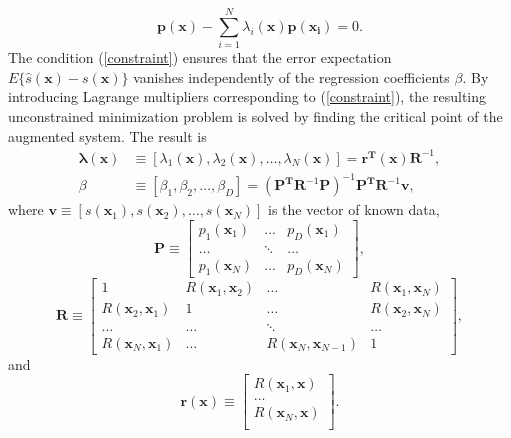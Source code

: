 \documentclass[12pt]{article}
\begin{document}
\begin{equation}
 \mathbf{p}(\mathbf{x}) - \sum_{i=1}^N
  \lambda_i(\mathbf{x})\mathbf{p}(\mathbf{x_i}) = 0. \label{constraint}
\end{equation}
The condition (\ref{constraint}) ensures that the error expectation
$E\{\hat{s}(\mathbf{x}) - s(\mathbf{x}) \}$ vanishes independently of the
regression coefficients $\beta$.  By introducing Lagrange multipliers
corresponding to (\ref{constraint}), the resulting unconstrained
minimization problem is solved by finding the
critical point of the augmented system.  The result is \cite{Knap2008}
\begin{align}
\mathbf{\lambda(x)} &\equiv \left [ \lambda_1(\mathbf{x}), \lambda_2(\mathbf{x}), \ldots,
  \lambda_N(\mathbf{x}) \right ] = \mathbf{r^T}(\mathbf{x})
  \mathbf{R}^{-1}, \\
\beta & \equiv \left [ \beta_1, \beta_2, \ldots, \beta_D \right ] = \left ( \mathbf{P^T}\mathbf{R}^{-1} \mathbf{P} \right )^{-1} \mathbf{P^T}\mathbf{R}^{-1}\mathbf{v},
\end{align}
where $\mathbf{v} \equiv [ s(\mathbf{x}_1), s(\mathbf{x}_2), \ldots,
  s(\mathbf{x}_N) ]$ is the vector of known data,
\begin{equation}
\mathbf{P} \equiv \left [
\begin{array}{ccc}
p_1(\mathbf{x}_1) & \ldots & p_D(\mathbf{x}_1) \\
\ldots & \ddots & \ldots \\
p_1(\mathbf{x}_N) & \ldots & p_D(\mathbf{x}_N)
\end{array}
\right ],
\end{equation}
\begin{equation}
\mathbf{R} \equiv \left [
\begin{array}{cccc}
1 & R(\mathbf{x}_1,\mathbf{x}_2)& \ldots &
R(\mathbf{x}_1,\mathbf{x}_N) \\
R(\mathbf{x}_2,\mathbf{x}_1) & 1 & \ldots &
R(\mathbf{x}_2,\mathbf{x}_N) \\
\ldots & \ldots & \ddots & \ldots \\
R(\mathbf{x}_N,\mathbf{x}_1) & \ldots &
R(\mathbf{x}_N,\mathbf{x}_{N-1}) & 1
\end{array}
\right ],
\end{equation}
and
\begin{equation}
\mathbf{r(x)} \equiv \left [
\begin{array}{c}
R(\mathbf{x}_1,\mathbf{x}) \\
\ldots \\
R(\mathbf{x}_N,\mathbf{x}) \\
\end{array}
\right ].
\end{equation}
\end{document}

